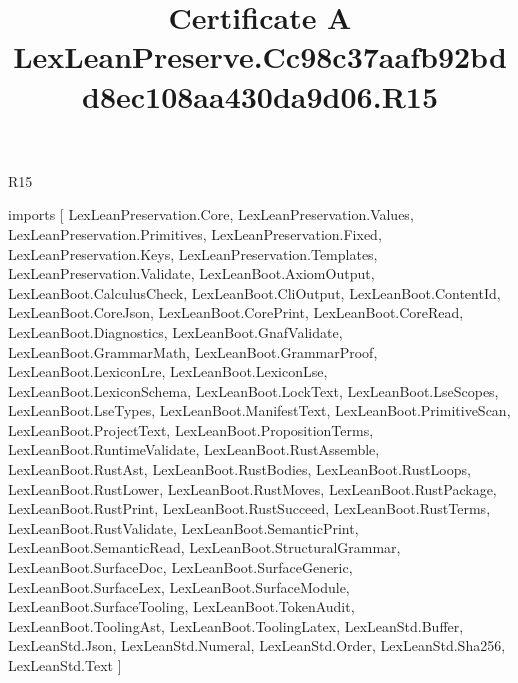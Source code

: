 \begin{lexlean}{R15}
\title{Certificate A LexLeanPreserve.Cc98c37aafb92bdd8ec108aa430da9d06.R15}
\begin{coremodule}
imports [
  LexLeanPreservation.Core,
  LexLeanPreservation.Values,
  LexLeanPreservation.Primitives,
  LexLeanPreservation.Fixed,
  LexLeanPreservation.Keys,
  LexLeanPreservation.Templates,
  LexLeanPreservation.Validate,
  LexLeanBoot.AxiomOutput,
  LexLeanBoot.CalculusCheck,
  LexLeanBoot.CliOutput,
  LexLeanBoot.ContentId,
  LexLeanBoot.CoreJson,
  LexLeanBoot.CorePrint,
  LexLeanBoot.CoreRead,
  LexLeanBoot.Diagnostics,
  LexLeanBoot.GnafValidate,
  LexLeanBoot.GrammarMath,
  LexLeanBoot.GrammarProof,
  LexLeanBoot.LexiconLre,
  LexLeanBoot.LexiconLse,
  LexLeanBoot.LexiconSchema,
  LexLeanBoot.LockText,
  LexLeanBoot.LseScopes,
  LexLeanBoot.LseTypes,
  LexLeanBoot.ManifestText,
  LexLeanBoot.PrimitiveScan,
  LexLeanBoot.ProjectText,
  LexLeanBoot.PropositionTerms,
  LexLeanBoot.RuntimeValidate,
  LexLeanBoot.RustAssemble,
  LexLeanBoot.RustAst,
  LexLeanBoot.RustBodies,
  LexLeanBoot.RustLoops,
  LexLeanBoot.RustLower,
  LexLeanBoot.RustMoves,
  LexLeanBoot.RustPackage,
  LexLeanBoot.RustPrint,
  LexLeanBoot.RustSucceed,
  LexLeanBoot.RustTerms,
  LexLeanBoot.RustValidate,
  LexLeanBoot.SemanticPrint,
  LexLeanBoot.SemanticRead,
  LexLeanBoot.StructuralGrammar,
  LexLeanBoot.SurfaceDoc,
  LexLeanBoot.SurfaceGeneric,
  LexLeanBoot.SurfaceLex,
  LexLeanBoot.SurfaceModule,
  LexLeanBoot.SurfaceTooling,
  LexLeanBoot.TokenAudit,
  LexLeanBoot.ToolingAst,
  LexLeanBoot.ToolingLatex,
  LexLeanStd.Buffer,
  LexLeanStd.Json,
  LexLeanStd.Numeral,
  LexLeanStd.Order,
  LexLeanStd.Sha256,
  LexLeanStd.Text
]


\end{coremodule}
\end{lexlean}
